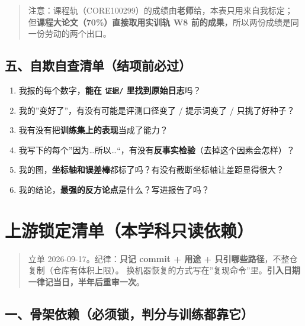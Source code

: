 \documentclass[
  chinese,
  11pt,
]{ctexart}
\providecommand{\tightlist}{%
  \setlength{\itemsep}{0pt}\setlength{\parskip}{0pt}}
\begin{document}
\begin{quote}
注意：课程轨（CORE100299）的成绩由\textbf{老师}给，本表只用来自我标定； 但\textbf{课程大论文（70\%）直接取用实训轨 W8 前的成果}，所以两份成绩是同一份劳动的两个出口。
\end{quote}

\subsection{五、自欺自查清单（结项前必过）}\label{ux4e94ux81eaux6b3aux81eaux67e5ux6e05ux5355ux7ed3ux9879ux524dux5fc5ux8fc7}

\begin{enumerate}
\def\labelenumi{\arabic{enumi}.}
\tightlist
\item
  我报的每个数字，\textbf{能在 \texttt{证据/} 里找到原始日志}吗？
\item
  我的''变好了''，有没有可能是评测口径变了 / 提示词变了 / 只挑了好种子？
\item
  我有没有把\textbf{训练集上的表现}当成了能力？
\item
  我写下的每个''因为\ldots 所以\ldots``，有没有\textbf{反事实检验}（去掉这个因素会怎样）？
\item
  我的图，\textbf{坐标轴和误差棒}都标了吗？有没有截断坐标轴让差距显得很大？
\item
  我的结论，\textbf{最强的反方论点}是什么？写进报告了吗？
\end{enumerate}

\newpage

\section{上游锁定清单（本学科只读依赖）}\label{ux4e0aux6e38ux9501ux5b9aux6e05ux5355ux672cux5b66ux79d1ux53eaux8bfbux4f9dux8d56}

\begin{quote}
立单 2026-09-17。纪律：\textbf{只记 commit + 用途 + 只引哪些路径}，不整仓复制（仓库有体积上限）。 换机器恢复的方式写在''复现命令''里。\textbf{引入日期一律记当日，半年后重审一次}。
\end{quote}

\subsection{一、骨架依赖（必须锁，判分与训练都靠它）}\label{ux4e00ux9aa8ux67b6ux4f9dux8d56ux5fc5ux987bux9501ux5224ux5206ux4e0eux8badux7ec3ux90fdux9760ux5b83}
\end{document}

